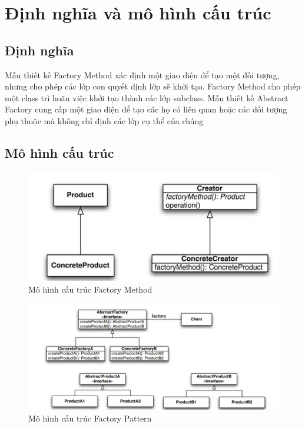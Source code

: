 \section{Định nghĩa và mô hình cấu trúc}
\subsection{Định nghĩa}
Mẫu thiết kế Factory Method xác định một giao diện để tạo một đối tượng, nhưng cho phép các lớp con
quyết định lớp sẽ khởi tạo. Factory Method cho phép một class trì hoãn việc khởi tạo thành các lớp subclass.
Mẫu thiết kế Abstract Factory cung cấp một giao diện để tạo các họ có liên quan hoặc các đối tượng phụ thuộc mà không chỉ định các lớp cụ thể của chúng
\subsection{Mô hình cấu trúc}
\begin{figure}[!htb]
    \centering
    \includegraphics[width=\textwidth]{fig/Factory/structure_factory_method.png}
    \caption{Mô hình cấu trúc Factory Method}
    \label{fig:structure_factory_method}
\end{figure}
\begin{figure}[!htb]
    \centering
    \includegraphics[width=\textwidth]{fig/Factory/structure_factory.png}
    \caption{Mô hình cấu trúc Factory Pattern}
    \label{fig:structure_factory}
\end{figure}
